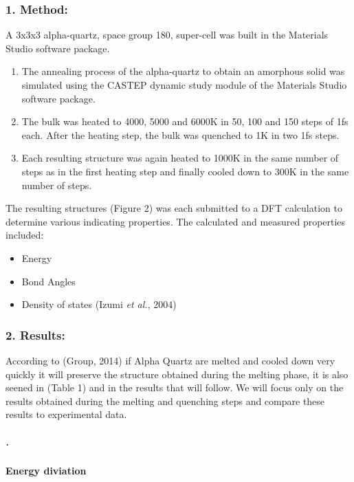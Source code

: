 \documentclass[]{article}
\let\oldparagraph\paragraph
\renewcommand{\paragraph}[1]{\oldparagraph{#1}\mbox{}}
\let\oldsubparagraph\subparagraph
\renewcommand{\subparagraph}[1]{\oldsubparagraph{#1}\mbox{}}
\begin{document}
\hypertarget{method}{%
\subsubsection{1. Method:}\label{method}}

A 3x3x3 alpha-quartz, space group 180, super-cell was built in the
Materials Studio software package.

\begin{enumerate}
\def\labelenumi{\arabic{enumi}.}
\item
  The annealing process of the alpha-quartz to obtain an amorphous solid
  was simulated using the CASTEP dynamic study module of the Materials
  Studio software package.
\item
  The bulk was heated to 4000, 5000 and 6000K in 50, 100 and 150 steps
  of 1fs each. After the heating step, the bulk was quenched to 1K in
  two 1fs steps.
\item
  Each resulting structure was again heated to 1000K in the same number
  of steps as in the first heating step and finally cooled down to 300K
  in the same number of steps.
\end{enumerate}

The resulting structures (Figure 2) was each submitted to a DFT
calculation to determine various indicating properties. The calculated
and measured properties included:

\begin{itemize}
\item
  Energy
\item
  Bond Angles
\item
  Density of states (Izumi \emph{et al.}, 2004)
\end{itemize}

\hypertarget{results}{%
\subsubsection{2. Results:}\label{results}}

According to (Group, 2014) if Alpha Quartz are melted and cooled down
very quickly it will preserve the structure obtained during the melting
phase, it is also seened in (Table 1) and in the results that will
follow. We will focus only on the results obtained during the melting
and quenching steps and compare these results to experimental data.

\hypertarget{section}{%
\subparagraph{.}\label{section}}

\hypertarget{energy-diviation}{%
\paragraph{Energy diviation}\label{energy-diviation}}
\end{document}
